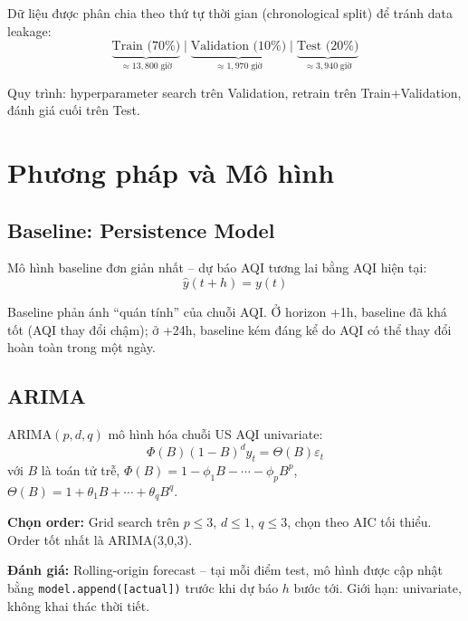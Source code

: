 \documentclass[12pt,a4paper]{report}
\begin{document}
Dữ liệu được phân chia theo thứ tự thời gian (chronological split) để tránh data leakage:
\begin{equation}
  \underbrace{\text{Train (70\%)}}_{\approx 13{,}800\;\text{giờ}} \;\Big|\;
  \underbrace{\text{Validation (10\%)}}_{\approx 1{,}970\;\text{giờ}} \;\Big|\;
  \underbrace{\text{Test (20\%)}}_{\approx 3{,}940\;\text{giờ}}
\end{equation}

Quy trình: hyperparameter search trên Validation, retrain trên Train+Validation, đánh giá cuối trên Test.

\chapter{Phương pháp và Mô hình}

\section{Baseline: Persistence Model}

Mô hình baseline đơn giản nhất -- dự báo AQI tương lai bằng AQI hiện tại:
\begin{equation}
  \hat{y}(t+h) = y(t)
\end{equation}

Baseline phản ánh ``quán tính'' của chuỗi AQI. Ở horizon +1h, baseline đã khá tốt (AQI thay đổi chậm); ở +24h, baseline kém đáng kể do AQI có thể thay đổi hoàn toàn trong một ngày.

\section{ARIMA}

ARIMA$(p, d, q)$ mô hình hóa chuỗi US AQI univariate:
\begin{equation}
  \Phi(B)(1-B)^d y_t = \Theta(B)\varepsilon_t
\end{equation}
với $B$ là toán tử trễ, $\Phi(B) = 1 - \phi_1 B - \cdots - \phi_p B^p$, $\Theta(B) = 1 + \theta_1 B + \cdots + \theta_q B^q$.

\textbf{Chọn order:} Grid search trên $p \leq 3$, $d \leq 1$, $q \leq 3$, chọn theo AIC tối thiểu. Order tốt nhất là ARIMA(3,0,3).

\textbf{Đánh giá:} Rolling-origin forecast -- tại mỗi điểm test, mô hình được cập nhật bằng \texttt{model.append([actual])} trước khi dự báo $h$ bước tới. Giới hạn: univariate, không khai thác thời tiết.
\end{document}
